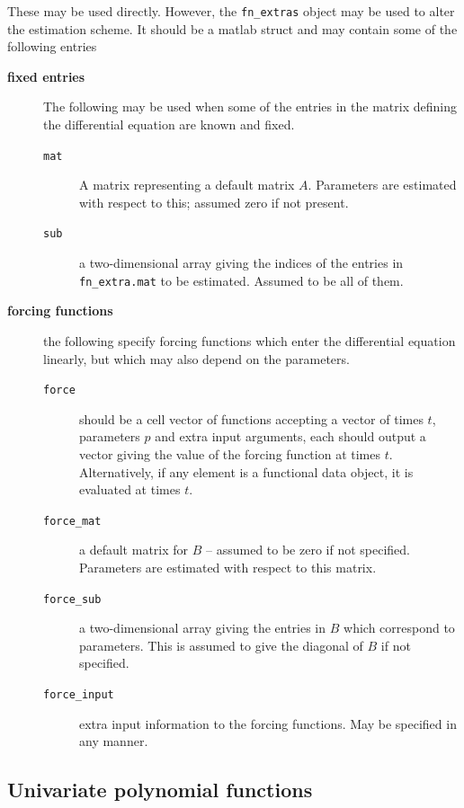\documentclass{article}
\begin{document}
These may be used directly. However, the {\tt fn\_extras}
object may be used to alter the estimation scheme. It
should be a matlab struct and may contain some of the
following entries

\begin{description}

\item[{\bf fixed entries}] The following may be used when
some of the entries in the matrix defining the differential
equation are known and fixed.

\begin{description}
\item[{\tt mat}] A matrix representing a default matrix $A$.
Parameters are estimated with
respect to this; assumed zero if not present.
\item[{\tt sub}] a two-dimensional array giving the indices
of the entries in {\tt fn\_extra.mat} to be estimated.
Assumed to be all of them.
\end{description}

\item[{\bf forcing functions}] the following specify
forcing functions which enter the differential equation
linearly, but which may also depend on the parameters.

\begin{description}
\item[{\tt force}] should be a cell vector of
functions accepting a vector of times $t$, parameters $p$
and extra input arguments, each should output a vector giving
the value of the forcing function at times $t$.
Alternatively, if any element is a functional data object,
it is evaluated at times $t$.
\item[{\tt force\_mat}] a default matrix for $B$ --
assumed to be zero if not specified.
Parameters are estimated with respect to this matrix.
\item[{\tt force\_sub}] a two-dimensional array giving the
entries in $B$ which correspond to parameters. This is
assumed to give the diagonal of $B$ if not specified.\
\item[{\tt force\_input}] extra input information to the
forcing functions. May be specified in any manner.
\end{description}

\end{description}

\subsection{Univariate polynomial functions}
\end{document}
